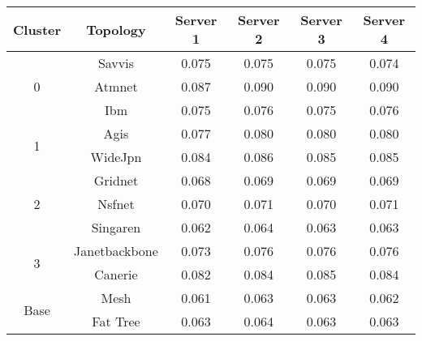 \begin{tabular}{cccccc}
\toprule
Cluster & Topology & Server 1 & Server 2 & Server 3 & Server 4 \\
\midrule
\multirow{3}{*}{0}& Savvis & 0.075 & 0.075 & 0.075 & 0.074 \\
& Atmnet & 0.087 & 0.090 & 0.090 & 0.090 \\
& Ibm & 0.075 & 0.076 & 0.075 & 0.076 \\ \hline
\multirow{2}{*}{1}& Agis & 0.077 & 0.080 & 0.080 & 0.080 \\
& WideJpn & 0.084 & 0.086 & 0.085 & 0.085 \\ \hline
\multirow{3}{*}{2}& Gridnet & 0.068 & 0.069 & 0.069 & 0.069 \\
& Nsfnet & 0.070 & 0.071 & 0.070 & 0.071 \\
& Singaren & 0.062 & 0.064 & 0.063 & 0.063 \\ \hline
\multirow{2}{*}{3}& Janetbackbone & 0.073 & 0.076 & 0.076 & 0.076 \\
& Canerie & 0.082 & 0.084 & 0.085 & 0.084 \\ \hline
\multirow{2}{*}{Base}& Mesh & 0.061 & 0.063 & 0.063 & 0.062 \\
& Fat Tree & 0.063 & 0.064 & 0.063 & 0.063 \\
\bottomrule
\end{tabular}
